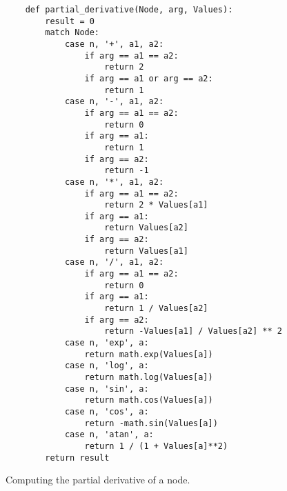 \begin{figure}[!ht]
\centering
\begin{verbatim}
    def partial_derivative(Node, arg, Values):
        result = 0
        match Node:
            case n, '+', a1, a2:
                if arg == a1 == a2:
                    return 2
                if arg == a1 or arg == a2:
                    return 1
            case n, '-', a1, a2:
                if arg == a1 == a2:
                    return 0
                if arg == a1:
                    return 1
                if arg == a2:
                    return -1
            case n, '*', a1, a2:
                if arg == a1 == a2:
                    return 2 * Values[a1]
                if arg == a1:
                    return Values[a2]
                if arg == a2:
                    return Values[a1]
            case n, '/', a1, a2:
                if arg == a1 == a2:
                    return 0
                if arg == a1:
                    return 1 / Values[a2]
                if arg == a2:
                    return -Values[a1] / Values[a2] ** 2
            case n, 'exp', a:
                return math.exp(Values[a])
            case n, 'log', a:
                return math.log(Values[a])
            case n, 'sin', a:
                return math.cos(Values[a])
            case n, 'cos', a:
                return -math.sin(Values[a])
            case n, 'atan', a:
                return 1 / (1 + Values[a]**2)
        return result
\end{verbatim}
\vspace*{-0.3cm}
\caption{Computing the partial derivative of a node.}
\label{fig:Reverse-Mode-AD.ipynb:partial_derivative}
\end{figure}


